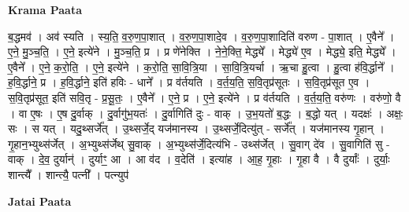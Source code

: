 \documentclass[17pt]{extarticle}
\begin{document}
\textbf{Krama Paata} \newline

ब॒द्धमव॑ । अव॑ स्यति । स्य॒ति॒ व॒रु॒ण॒पा॒शात् । व॒रु॒ण॒पा॒शादे॒व । व॒रु॒ण॒पा॒शादिति॑ वरुण - पा॒शात् । ए॒वैने᳚ । ए॒ने॒ मु॒ञ्च॒ति॒ । ए॒ने॒ इत्ये॑ने । मु॒ञ्च॒ति॒ प्र । प्र णे॑नेक्ति । ने॒ने॒क्ति॒ मेद्ध्ये᳚ । मेद्ध्ये॑ ए॒व । मेद्ध्ये॒ इति॒ मेद्ध्ये᳚ । ए॒वैने᳚ । ए॒ने॒ क॒रो॒ति॒ । ए॒ने॒ इत्ये॑ने । क॒रो॒ति॒ सा॒वि॒त्रि॒या । सा॒वि॒त्रि॒यर्चा । ऋ॒चा हु॒त्वा । हु॒त्वा ह॑वि॒र्द्धाने᳚ । ह॒वि॒र्द्धाने॒ प्र । ह॒वि॒र्द्धाने॒ इति॑ हविः - धाने᳚ । प्र व॑र्तयति । व॒र्त॒य॒ति॒ स॒वि॒तृप्र॑सूतः । स॒वि॒तृप्र॑सूत ए॒व । स॒वि॒तृप्र॑सूत॒ इति॑ सवि॒तृ - प्र॒सू॒तः॒ । ए॒वैने᳚ । ए॒ने॒ प्र । ए॒ने॒ इत्ये॑ने । प्र व॑र्तयति । व॒र्त॒य॒ति॒ वरु॑णः । वरु॑णो॒ वै । वा ए॒षः । ए॒ष दु॒र्वाक् । दु॒र्वागु॑भ॒यतः॑ । दु॒र्वागिति॑ दुः - वाक् । उ॒भ॒यतो॑ ब॒द्धः । ब॒द्धो यत् । यदक्षः॑ । अक्षः॒ सः । स यत् । यदु॒थ्सर्जे᳚त् । उ॒थ्सर्जे॒द् यज॑मानस्य । उ॒थ्सर्जे॒दित्यु॑त् - सर्जे᳚त् । यज॑मानस्य गृ॒हान् । गृ॒हान॒भ्युथ्स॑र्जेत् । अ॒भ्युथ्स॑र्जेथ् सु॒वाक् । अ॒भ्युथ्स॑र्जे॒दित्य॑भि - उथ्स॑र्जेत् । सु॒वाग् दे॑व । सु॒वागिति॑ सु - वाक् । दे॒व॒ दुर्यान्॑ । दुर्याꣳ॒॒ आ । आ व॑द । व॒देति॑ । इत्या॑ह । आ॒ह॒ गृ॒हाः । गृ॒हा वै । वै दुर्याः᳚ । दुर्याः॒ शान्त्यै᳚ । शान्त्यै॒ पत्नी᳚ । पत्न्युप॑ \newline

\textbf{Jatai Paata} \newline
\end{document}
